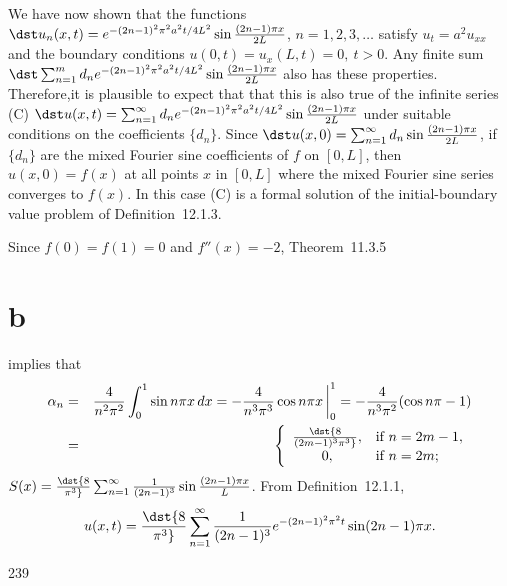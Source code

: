 \documentclass[dvips]{book}
\renewcommand{\exer}[1]{\par\medskip\;\noindent{\color{red}\bf #1.}}
\numberwithin{example}{section}
\numberwithin{equation}{section}
\numberwithin{theorem}{section}
\numberwithin{table}{section}
\numberwithin{figure}{section}
\newcommand{\lims}[2]{\,\bigg|_{#1}^{#2}}
\begin{document}
We have now shown that the functions
$\dst u_n(x,t)=e^{-(2n-1)^2\pi^2a^2t/4L^2}\sin{(2n-1)\pi x\over2L}$,
$n=1,2,3,\dots$
 satisfy $u_t=a^2u_{xx}$ and the boundary conditions
 $u(0,t)= u_x(L,t)=0, \ t>0$.
Any finite sum
$\dst \sum_{n=1}^m d_ne^{-(2n-1)^2\pi^2a^2t/4L^2}\sin{(2n-1)\pi x\over2L}$
also has these properties.
Therefore,it is plausible to expect that that this is also true of
the infinite series
(C) $\dst u(x,t)=\sum_{n=1}^\infty
d_ne^{-(2n-1)^2\pi^2a^2t/4L^2}\sin{(2n-1)\pi x\over2L}$
under suitable conditions on the coefficients $\{d_n\}$.
Since
$\dst u(x,0)=\sum_{n=1}^\infty d_n\sin{(2n-1)\pi x\over2L}$,
if $\{d_n\}$ are the mixed Fourier sine coefficients of
$f$ on $[0,L]$, then
$u(x,0)=f(x)$ at all points $x$ in $[0,L]$ where the mixed Fourier
sine series
 converges to $f(x)$. In this case  (C)
is a formal solution of the initial-boundary value problem
of Definition~12.1.3.


\exer{12.1.8}
Since $f(0)=f(1)=0$ and $f''(x)=-2$, Theorem~11.3.5\part{b}
 implies that
\begin{eqnarray*}
\alpha_n&=&
{4\over n^2\pi^2}
\int_0^1\sin n\pi x\,dx
=-{4\over n^3\pi^3}\cos n\pi x\lims01=
-{4\over n^3\pi^2}(\cos n\pi-1)\\
&=&\left\{\begin{array}{cl}
\dst{8\over(2m-1)^3\pi^3},&\mbox{if $n=2m-1$},\\
0,&\mbox{if  $n=2m$};
\end{array}\right.
\end{eqnarray*}
$S(x)=\dst{8\over\pi^3}\sum_{n=1}^\infty{1\over(2n-1)^3}
\sin{(2n-1)\pi x\over L}$.
From Definition~12.1.1,
$$
u(x,t)=\dst{8\over\pi^3}\sum_{n=1}^\infty
{1\over(2n-1)^3}
e^{-(2n-1)^2\pi^2t}\sin(2n-1)\pi x.
$$
\enlargethispage{1in}
\smallskip
\centerline{239}

\newpage
\end{document}
